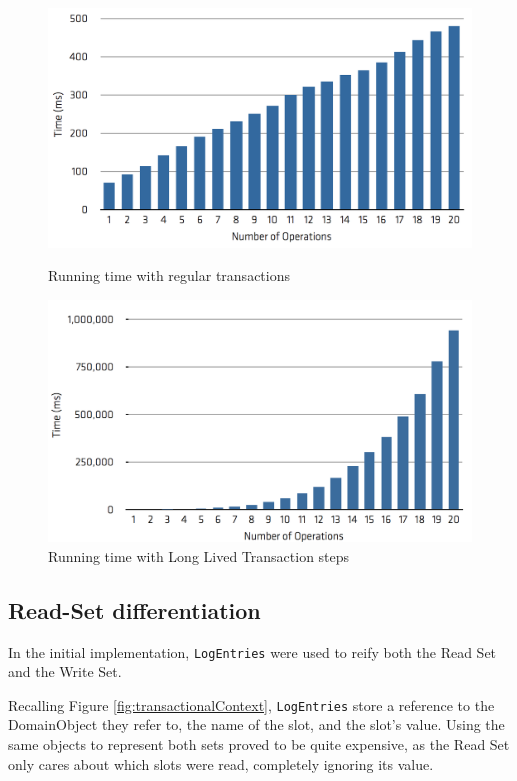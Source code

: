 \documentclass{llncs}
\begin{document}
\begin{figure}
\centering
\begin{minipage}{.5\textwidth}
  \centering
  \includegraphics[width=1\linewidth]{time-regular}
  \caption{Running time with regular transactions}
  \label{fig:regTime}
\end{minipage}%
\begin{minipage}{.5\textwidth}
  \centering
  \includegraphics[width=1\linewidth]{time-long-v1}
  \caption{Running time with Long Lived Transaction steps}
\end{minipage}
\end{figure}

\subsection{Read-Set differentiation}

In the initial implementation, \texttt{LogEntries} were used to reify
both the Read Set and the Write Set.

Recalling Figure \ref{fig:transactionalContext}, \texttt{LogEntries}
store a reference to the DomainObject they refer to, the name of the
slot, and the slot's value. Using the same objects to represent both
sets proved to be quite expensive, as the Read Set only cares about
which slots were read, completely ignoring its value.
\end{document}
